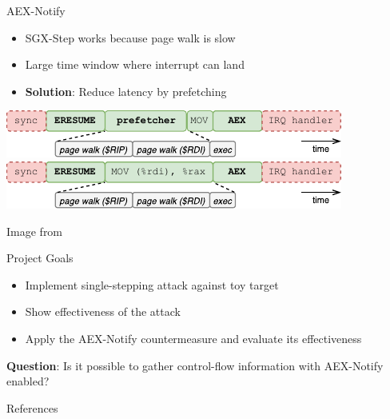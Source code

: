 \documentclass{beamer}
\begin{document}
\begin{frame}{AEX-Notify}
    \begin{itemize}
        \item SGX-Step works because page walk is slow
        \item Large time window where interrupt can land
        \item<2> \textbf{Solution}: Reduce latency by prefetching
    \end{itemize}

    \begin{center}
        {\includegraphics[scale=1.5]{sgx-step-with-prefetch.pdf}}
        {\includegraphics[scale=1.5]{sgx-step-without-prefetch.pdf}}
    \end{center}
    {\tiny\hfill\color{gray} Image from \cite{ConstableBCXXAK23}}
\end{frame}

\begin{frame}{Project Goals}
    \begin{itemize}
        \item Implement single-stepping attack against toy target
        \item Show effectiveness of the attack
        \item Apply the AEX-Notify countermeasure and evaluate its effectiveness
    \end{itemize}
    \textbf{Question}: Is it possible to gather control-flow information with AEX-Notify enabled?
\end{frame}

\begin{frame}[allowframebreaks]{References}
    
    
\end{frame}
\end{document}

